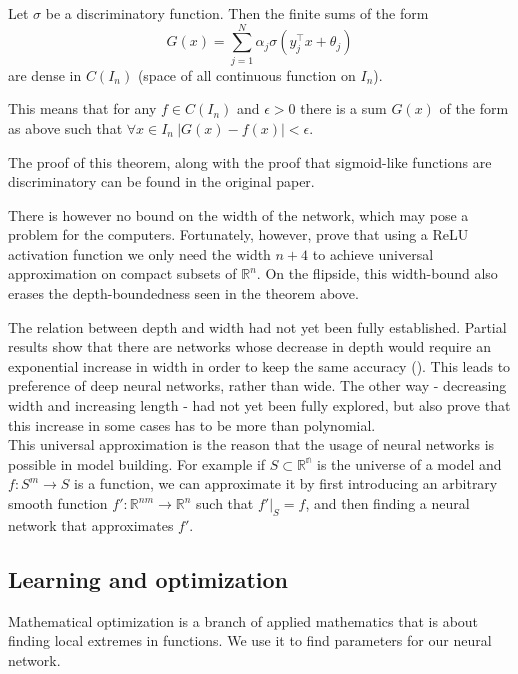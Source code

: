 \begin{thm}
	Let $\sigma$ be a discriminatory function. Then the finite sums of the form $$G(x)=\sum_{j=1}^N\alpha_j\sigma(y_j^\top x+\theta_j)$$ are dense in $C(I_n)$ (space of all continuous function on $I_n$).
	
	This means that for any $f\in C(I_n)$ and $\epsilon>0$ there is a sum $G(x)$ of the form as above such that $\forall x\in I_n\ |G(x)-f(x)|<\epsilon$.
\end{thm}

The proof of this theorem, along with the proof that sigmoid-like functions are discriminatory can be found in the original paper.

There is however no bound on the width of the network, which may pose a problem for the computers. Fortunately, however, \cite{narrownet} prove that using a ReLU activation function we only need the width $n+4$ to achieve universal approximation on compact subsets of $\mathbb{R}^n$. On the flipside, this width-bound also erases the depth-boundedness seen in the theorem above.

The relation between depth and width had not yet been fully established. Partial results show that there are networks whose decrease in depth would require an exponential increase in width in order to keep the same accuracy (\cite{widthexp}). This leads to preference of deep neural networks, rather than wide. The other way - decreasing width and increasing length - had not yet been fully explored, but \cite{narrownet} also prove that this increase in some cases has to be more than polynomial.\\

This universal approximation is the reason that the usage of neural networks is possible in model building. For example if $S\subset\mathbb{R^n}$ is the universe of a model and $f:S^m\rightarrow S$ is a function, we can approximate it by first introducing an arbitrary smooth function $f':\mathbb{R}^{nm}\rightarrow \mathbb{R}^n$ such that $\left.f'\right|_S=f$, and then finding a neural network that approximates $f'$.

\subsection{Learning and optimization}
\label{section:learning+opt}
Mathematical optimization is a branch of applied mathematics that is about finding local extremes in functions. We use it to find parameters for our neural network.

